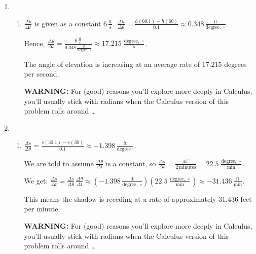 \documentclass{ximera}
\begin{document}
\begin{enumerate}
\setcounter{enumi}{\value{HW}}
\item \begin{enumerate} \addtocounter{enumii}{1}

\item  $\frac{\Delta h}{\Delta t}$ is given as a constant $6 \, \frac{\text{ft}}{\text{s}}$. $\frac{\Delta h}{\Delta \theta} = \frac{h(60.1) - h(60)}{0.1} \approx 0.348 \, \frac{\text{ft}}{\text{degree,  } \,  \circ}$.  

\smallskip

Hence, $\frac{\Delta \theta}{\Delta t} = \frac{ 6 \, \frac{\text{ft}}{\text{s}}   }{ 0.348 \, \frac{\text{ft}}{\text{degree,  } \, \circ}} \approx 17.215 \, \frac{ \text{degree,  } \, \circ}{s}$.  

\smallskip

The angle of elevation is increasing at an average rate of $17.215$ degrees  per second.  

\smallskip

\textbf{WARNING:} For (good) reasons you'll explore more deeply in Calculus, you'll usually stick with radians when the Calculus version of this problem rolls around \ldots  

\end{enumerate}


\item  \begin{enumerate} \addtocounter{enumii}{1}

\item   $\frac{\Delta s}{\Delta \theta} = \frac{s(30.1) - s(30)}{0.1} \approx -1.398 \, \frac{\text{ft}}{\text{degree} \,  \circ}$.  

\smallskip

We are told to assume $\frac{\Delta \theta }{\Delta t}$ is a constant, so $\frac{\Delta s}{\Delta t} = \frac{45^{\circ}}{2 \, \text{minutes}} = 22.5 \, \frac{\text{degree,  } \, \circ}{\text{min}}$.

\smallskip

We get:  $\frac{\Delta s}{\Delta t} = \frac{\Delta s}{\Delta \theta} \, \frac{\Delta \theta }{\Delta t} \approx \left(-1.398 \, \frac{\text{ft}}{\text{degree,  } \,  \circ} \right) \left(  22.5 \, \frac{\text{degree,  } \, \circ}{\text{min}} \right) \approx -31.436 \, \frac{\text{ft}}{\text{min}}$.

\smallskip

This means the shadow is receding at a rate of approximately 31.436 feet per minute.

\smallskip

\textbf{WARNING:} For (good) reasons you'll explore more deeply in Calculus, you'll usually stick with radians when the Calculus version of this problem rolls around \ldots  

\end{enumerate}


\setcounter{HW}{\value{enumi}}
\end{enumerate}
\end{document}
